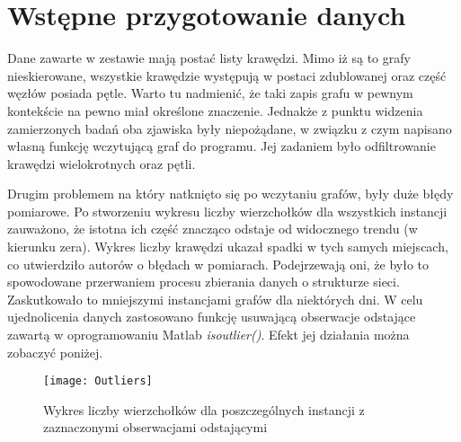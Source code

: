 \section{Wstępne przygotowanie danych}

Dane zawarte w zestawie mają postać listy krawędzi. Mimo iż są to grafy nieskierowane, wszystkie krawędzie występują w postaci zdublowanej oraz część węzłów posiada pętle. Warto tu nadmienić, że taki zapis grafu w pewnym kontekście na pewno miał określone znaczenie. Jednakże z punktu widzenia zamierzonych badań oba zjawiska były niepożądane, w związku z czym napisano własną funkcję wczytującą graf do programu. Jej zadaniem było odfiltrowanie krawędzi wielokrotnych oraz pętli. 

Drugim problemem na który natknięto się po wczytaniu grafów, były duże błędy pomiarowe. Po stworzeniu wykresu liczby wierzchołków dla wszystkich instancji zauważono, że istotna ich część znacząco odstaje od widocznego trendu (w kierunku zera). Wykres liczby krawędzi ukazał spadki w tych samych miejscach, co utwierdziło autorów o błędach w pomiarach. Podejrzewają oni, że było to spowodowane przerwaniem procesu zbierania danych o strukturze sieci. Zaskutkowało to mniejszymi instancjami grafów dla niektórych  dni. W celu ujednolicenia danych zastosowano funkcję usuwającą obserwacje odstające zawartą w oprogramowaniu Matlab \textit{isoutlier()}. Efekt jej działania można zobaczyć poniżej.

\begin{figure}[h]
	\centering
	\texttt{[image: Outliers]}
	\caption{Wykres liczby wierzchołków dla poszczególnych instancji z zaznaczonymi obserwacjami odstającymi}
\end{figure}


